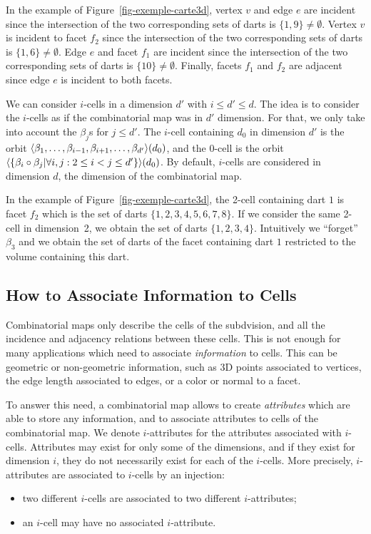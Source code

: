 In the example of Figure~\ref{fig-exemple-carte3d}, vertex $v$ and
edge $e$ are incident since the intersection of the two corresponding
sets of darts is $\{1,9\}\neq \emptyset$. Vertex $v$ is incident to facet
$f_2$ since the intersection of the two corresponding sets of darts is
$\{1,6\}\neq \emptyset$. Edge $e$ and facet $f_1$ are incident
since the intersection of the two corresponding sets of darts is
$\{10\}\neq \emptyset$. Finally, facets $f_1$ and $f_2$ are adjacent
since edge $e$ is incident to both facets.

We can consider $i$-cells in a dimension $d'$ with $i \leq d' \leq
d$. The idea is to consider the $i$-cells as if the combinatorial map
was in $d'$ dimension. For that, we only take into account the
$\beta_j$s for $j \leq d'$.  The $i$-cell containing $d_0$ in dimension
$d'$ is the orbit
$\langle{}\beta_1,\ldots,\beta_{i-1},\beta_{i+1},\ldots,\beta_{d'}\rangle{}(d_0)$, and
the 0-cell is the orbit $\langle{}\{\beta_{i}\circ\beta_{j}|\forall i,j: 2\leq
  i<j \leq d'\}\rangle{}(d_0)$.  By default, $i$-cells are considered in
dimension $d$, the dimension of the combinatorial map.

In the example of Figure~\ref{fig-exemple-carte3d}, the 2-cell
containing dart $1$ is facet $f_2$ which is the set of darts
$\{1,2,3,4,5,6,7,8\}$. If we consider the same 2-cell in dimension~2,
we obtain the set of darts $\{1,2,3,4\}$. Intuitively we ``forget''
$\beta_3$ and we obtain the set of darts of the facet containing dart
$1$ restricted to the volume containing this dart.

\subsection{How to Associate Information to Cells}
\label{ssec-associate-attributes}
Combinatorial maps only describe the cells of the subdvision, and all
the incidence and adjacency relations between these cells. This is not
enough for many applications which need to associate
\emph{information} to cells.  This can be geometric or non-geometric
information, such as 3D points associated to vertices, the edge length
associated to edges, or a color or normal to a facet.

To answer this need, a combinatorial map allows to create
\emph{attributes} which are able to store any information, and to
associate attributes to cells of the combinatorial map.  We denote
$i$-attributes for the attributes associated with
$i$-cells. Attributes may exist for only some of the dimensions, and
if they exist for dimension $i$, they do not necessarily exist for
each of the $i$-cells.  More precisely, $i$-attributes are associated
to $i$-cells by an injection:
\begin{itemize}
\item two different $i$-cells are associated to two different
  $i$-attributes;
\item an $i$-cell may have no associated $i$-attribute.
\end{itemize}


